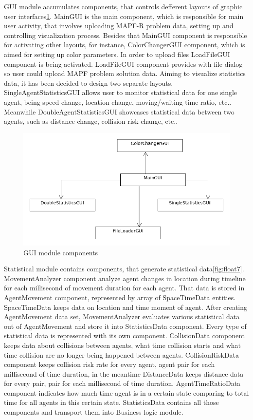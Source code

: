 \documentclass[thesis=B,english]{FITthesis}[2019/12/23]
\begin{document}
GUI module accumulates components, that controls defferent layouts of graphic user interfaces\ref{fig:float6}. MainGUI is the main component, which is responsible for main user activity, that involves uploading MAPF-R problem data, setting up and controlling visualization process. Besides that MainGUI component is responsible for activating other layouts, for instance, ColorChangerGUI component, which is aimed for setting up color parameters. In order to upload files LoadFileGUI component is being activated. LoadFileGUI component provides with file dialog so user could upload MAPF problem solution data. Aiming to visualize statistics data, it has been decided to design two separate layouts. SingleAgentStatisticsGUI allows user to monitor statistical data for one single agent, being speed change, location change, moving/waiting time ratio, etc.. Meanwhile DoubleAgentStatisticsGUI showcases statistical data between two agents, such as distance change, collision risk change, etc..      

\begin{figure}
	\includegraphics[scale=0.4]{GUI.png}
	\caption[GUI]{GUI module components}\label{fig:float6}
\end{figure}


Statistical module contains components, that generate statistical data\ref{fig:float7}. MovementAnalyzer component analyze agent changes in location during timeline for each millisecond of movement duration for each agent. That data is stored in AgentMovement component, represented by array of SpaceTimeData entities. SpaceTimeData keeps data on location and time moment of agent. After creating AgentMovement data set, MovementAnalyzer evaluates various statistical data out of AgentMovement and store it into StatisticsData component. Every type of statistical data is represented with its own component. CollisionData component keeps data about collisions between agents, what time collision starts and what time collision are no longer being happened between agents. CollisionRiskData component keeps collision risk rate for every {agent, agent} pair for each millisecond of time duration, in the meantime DistanceData keeps distance data for every {pair, pair} for each millisecond of time duration. AgentTimeRatioData component indicates how much time agent is in a certain state comparing to total time for all agents in this certain state. StatisticsData contains all those components and transport them into Business logic module.
\end{document}
